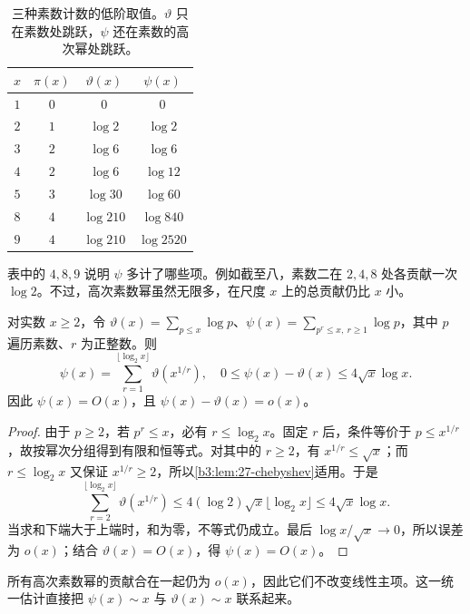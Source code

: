 \begin{table}[htbp]
\centering
\caption[三种素数计数的低阶取值]{三种素数计数的低阶取值。\(\vartheta\) 只在素数处跳跃，\(\psi\) 还在素数的高次幂处跳跃。}
\label{b3:tab:27-counting-values}
\begin{tabular}{c c c c}
\toprule
\(x\) & \(\pi(x)\) & \(\vartheta(x)\) & \(\psi(x)\) \\
\midrule
\(1\) & \(0\) & \(0\) & \(0\) \\
\(2\) & \(1\) & \(\log2\) & \(\log2\) \\
\(3\) & \(2\) & \(\log6\) & \(\log6\) \\
\(4\) & \(2\) & \(\log6\) & \(\log12\) \\
\(5\) & \(3\) & \(\log30\) & \(\log60\) \\
\(8\) & \(4\) & \(\log210\) & \(\log840\) \\
\(9\) & \(4\) & \(\log210\) & \(\log2520\) \\
\bottomrule
\end{tabular}
\end{table}

表中的 \(4,8,9\) 说明 \(\psi\) 多计了哪些项。例如截至八，素数二在 \(2,4,8\) 处各贡献一次 \(\log2\)。不过，高次素数幂虽然无限多，在尺度 \(x\) 上的总贡献仍比 \(x\) 小。

\begin{proposition}[高次素数幂的粗误差]
\label{b3:prop:27-prime-power-error}
对实数 \(x\ge2\)，令 \(\vartheta(x)=\sum_{p\le x}\log p\)、\(\psi(x)=\sum_{p^r\le x,\ r\ge1}\log p\)，其中 \(p\) 遍历素数、\(r\) 为正整数。则
\[
 \psi(x)=\sum_{r=1}^{\lfloor\log_2x\rfloor}\vartheta(x^{1/r}),
 \quad
 0\le\psi(x)-\vartheta(x)\le4\sqrt x\log x.
\]
因此 \(\psi(x)=O(x)\)，且 \(\psi(x)-\vartheta(x)=o(x)\)。
\end{proposition}
\begin{proof}
由于 \(p\ge2\)，若 \(p^r\le x\)，必有 \(r\le\log_2x\)。固定 \(r\) 后，条件等价于 \(p\le x^{1/r}\)，故按幂次分组得到有限和恒等式。对其中的 \(r\ge2\)，有 \(x^{1/r}\le\sqrt x\)；而 \(r\le\log_2x\) 又保证 \(x^{1/r}\ge2\)，所以\cref{b3:lem:27-chebyshev}适用。于是
\[
 \sum_{r=2}^{\lfloor\log_2x\rfloor}\vartheta(x^{1/r})
 \le4(\log2)\sqrt x\lfloor\log_2x\rfloor
 \le4\sqrt x\log x.
\]
当求和下端大于上端时，和为零，不等式仍成立。最后 \(\log x/\sqrt x\to0\)，所以误差为 \(o(x)\)；结合 \(\vartheta(x)=O(x)\)，得 \(\psi(x)=O(x)\)。
\end{proof}

所有高次素数幂的贡献合在一起仍为 \(o(x)\)，因此它们不改变线性主项。这一统一估计直接把 \(\psi(x)\sim x\) 与 \(\vartheta(x)\sim x\) 联系起来。

